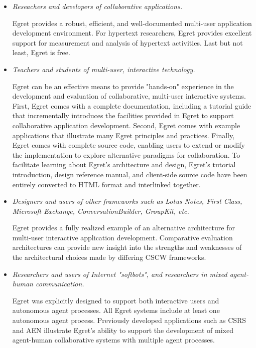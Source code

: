 \begin{itemize}
\item {\em Reseachers and developers of collaborative applications.}

  Egret provides a robust, efficient, and well-documented multi-user
  application development environment.  For hypertext researchers, Egret
  provides excellent support for measurement and analysis of
  hypertext activities.  Last but not least, Egret is free.

\item {\em Teachers and students of multi-user, interactive technology.}

  Egret can be an effective means to provide "hands-on" experience in the
  development and evaluation of collaborative, multi-user interactive
  systems.  First, Egret comes with a complete documentation, including a
  tutorial guide that incrementally introduces the facilities provided in
  Egret to support collaborative application development.  Second, Egret
  comes with example applications that illustrate many Egret principles and
  practices.  Finally, Egret comes with complete source code, enabling
  users to extend or modify the implementation to explore alternative
  paradigms for collaboration. To facilitate learning about Egret's
  architecture and design, Egret's tutorial introduction, design
  reference manual, and client-side source code have been entirely
  converted to HTML format and interlinked together.

\item {\em Designers and users of other frameworks such as Lotus Notes,
  First Class, Microsoft Exchange, ConversationBuilder, GroupKit, etc. }

  Egret provides a fully realized example of an alternative architecture
  for multi-user interactive application development. Comparative
  evaluation architectures can provide new insight into the strengths and
  weaknesses of the architectural choices made by differing CSCW
  frameworks.

\item {\em Researchers and users of Internet "softbots", and researchers
  in mixed agent-human communication.}

  Egret was explicitly designed to support both interactive users and
  autonomous agent processes.  All Egret systems include at least one
  autonomous agent process.  Previously developed applications such
  as CSRS and AEN illustrate Egret's ability to support the
  development of mixed agent-human collaborative systems with
  multiple agent processes.

\end{itemize}




